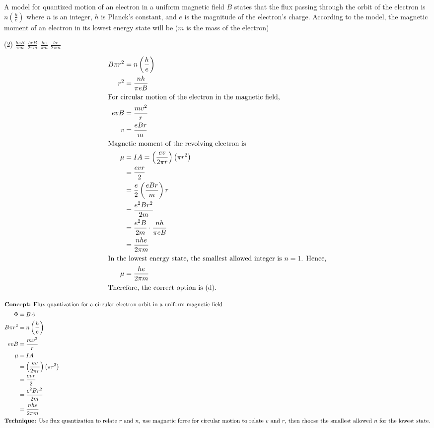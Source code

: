 \item A model for quantized motion of an electron in a uniform magnetic field $B$ states that the flux passing through the orbit of the electron is $n\left(\frac{h}{e}\right)$ where $n$ is an integer, $h$ is Planck's constant, and $e$ is the magnitude of the electron's charge. According to the model, the magnetic moment of an electron in its lowest energy state will be ($m$ is the mass of the electron)
\begin{tasks}(2)
    \task $\frac{heB}{\pi m}$
    \task $\frac{heB}{2\pi m}$
    \task $\frac{he}{\pi m}$
    \task $\frac{he}{2\pi m}$ \ans
\end{tasks}
\begin{solution}
\begin{align*}
B\pi r^2 &= n\left(\frac{h}{e}\right) \\
r^2 &= \frac{nh}{\pi eB} \\
\intertext{For circular motion of the electron in the magnetic field,}
e v B &= \frac{mv^2}{r} \\
v &= \frac{eBr}{m} \\
\intertext{Magnetic moment of the revolving electron is}
\mu &= IA = \left(\frac{ev}{2\pi r}\right)\left(\pi r^2\right) \\
      &= \frac{evr}{2} \\
      &= \frac{e}{2}\left(\frac{eBr}{m}\right)r \\
      &= \frac{e^2Br^2}{2m} \\
      &= \frac{e^2B}{2m}\cdot \frac{nh}{\pi eB} \\
      &= \frac{nhe}{2\pi m} \\
\intertext{In the lowest energy state, the smallest allowed integer is $n = 1$. Hence,}
\mu &= \frac{he}{2\pi m} \\
\intertext{Therefore, the correct option is (d).}
\end{align*}
\end{solution}

\begin{idea}
    \begin{align*}
    \intertext{\textbf{Concept:} Flux quantization for a circular electron orbit in a uniform magnetic field}
    \Phi &= BA \\
    B\pi r^2 &= n\left(\frac{h}{e}\right) \\
    evB &= \frac{mv^2}{r} \\
    \mu &= IA \\
    &= \left(\frac{ev}{2\pi r}\right)\left(\pi r^2\right) \\
    &= \frac{evr}{2} \\
    &= \frac{e^2Br^2}{2m} \\
    &= \frac{nhe}{2\pi m} \\
    \intertext{\textbf{Technique:} Use flux quantization to relate $r$ and $n$, use magnetic force for circular motion to relate $v$ and $r$, then choose the smallest allowed $n$ for the lowest state.}
    \end{align*}
\end{idea}
